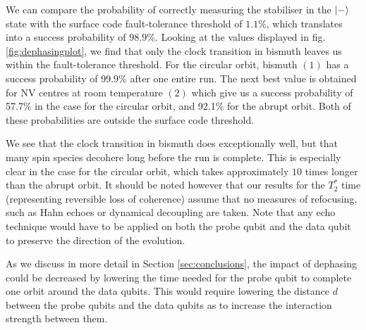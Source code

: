 We can compare the probability of correctly measuring the stabiliser in the $\ket{-}$ state with the surface code fault-tolerance threshold of $1.1\%$, which translates into a success probability of $98.9$\%. Looking at the values displayed in fig.\@ \ref{fig:dephasingplot}, we find that only the clock transition in bismuth leaves us within the fault-tolerance threshold. For the circular orbit, bismuth $(1)$ has a success probability of  99.9\% after one entire run. The next best value is obtained for NV centres at room temperature $(2)$ which give us a success probability of 57.7\% in the case for the circular orbit, and 92.1\% for the abrupt orbit. Both of these probabilities are outside the surface code threshold. 

We see that the clock transition in bismuth does exceptionally well, but that many spin species decohere long before the run is complete. This is especially clear in the case for the circular orbit, which takes approximately $10$ times longer than the abrupt orbit. It should be noted however that our results for the $T_2^*$ time (representing reversible loss of coherence) assume that no measures of refocusing, such as Hahn echoes \cite{levitt1979nmr} or dynamical decoupling \cite{viola1998dynamical} are taken. Note that any echo technique would have to be applied on both the probe qubit and the data qubit to preserve the direction of the evolution. 

As we discuss in more detail in Section \ref{sec:conclusions}, the impact of dephasing could be decreased by lowering the time needed for the probe qubit to complete one orbit around the data qubits. This would require lowering the distance $d$ between the probe qubits and the data qubits as to increase the interaction strength between them. 





